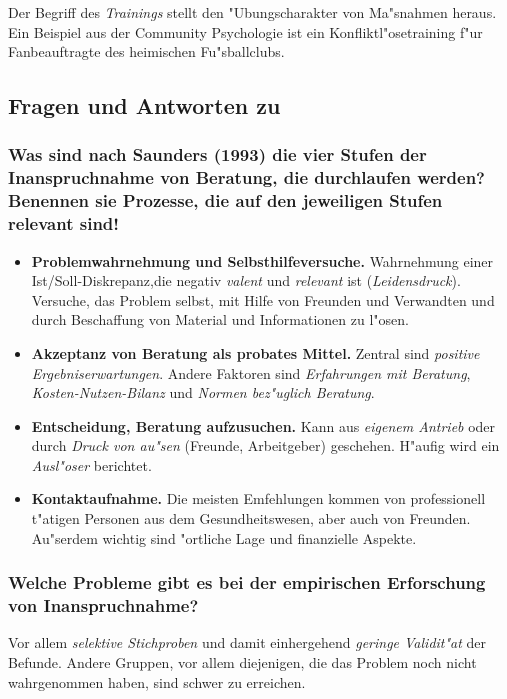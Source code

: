 \noindent Der Begriff des \emph{Trainings} stellt den "Ubungscharakter von Ma"snahmen heraus. Ein Beispiel aus der Community Psychologie ist ein Konfliktl"osetraining f"ur Fanbeauftragte des heimischen Fu"sballclubs.

\subsection{Fragen und Antworten zu \textcite{warschburger_beratungsprozess_2009}}
\subsubsection{Was sind nach Saunders (1993) die vier Stufen der Inanspruchnahme von Beratung, die durchlaufen werden? Benennen sie Prozesse, die auf den jeweiligen Stufen relevant sind!}
\begin{itemize}
        \item \textbf{Problemwahrnehmung und Selbsthilfeversuche.} Wahrnehmung einer Ist/Soll-Diskrepanz,die negativ \emph{valent} und \emph{relevant} ist (\emph{Leidensdruck}). Versuche, das Problem selbst, mit Hilfe von Freunden und Verwandten und durch Beschaffung von Material und Informationen zu l"osen.
        \item \textbf{Akzeptanz von Beratung als probates Mittel.} Zentral sind \emph{positive Ergebniserwartungen}. Andere Faktoren sind \emph{Erfahrungen mit Beratung}, \emph{Kosten-Nutzen-Bilanz} und \emph{Normen bez"uglich Beratung}.
        \item \textbf{Entscheidung, Beratung aufzusuchen.} Kann aus \emph{eigenem Antrieb} oder durch \emph{Druck von au"sen} (Freunde, Arbeitgeber) geschehen. H"aufig wird ein \emph{Ausl"oser} berichtet. 
        \item \textbf{Kontaktaufnahme.} Die meisten Emfehlungen kommen von professionell t"atigen Personen aus dem Gesundheitswesen, aber auch von Freunden. Au"serdem wichtig sind "ortliche Lage und finanzielle Aspekte.
\end{itemize}

\subsubsection{Welche Probleme gibt es bei der empirischen Erforschung von Inanspruchnahme?}
Vor allem \emph{selektive Stichproben} und damit einhergehend \emph{geringe Validit"at} der Befunde. Andere Gruppen, vor allem diejenigen, die das Problem noch nicht wahrgenommen haben, sind schwer zu erreichen.

